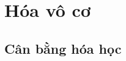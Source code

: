 \documentclass[Main.tex]{subfiles}
\begin{document}
\part{Hóa vô cơ}
\chapter{Cân bằng hóa học}
\hienthiloigiaiex
\hienthiloigiaibt
\hienthiloigiaivd


\end{document}
